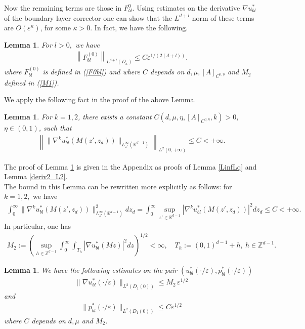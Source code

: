 \documentclass[11pt, reqno]{amsart}
\newtheorem{lemma}[theorem]{Lemma}
\theoremstyle{definition}
\theoremstyle{remark}
\numberwithin{equation}{section}
\begin{document}
	\noindent Now the remaining terms are those in $F^0_{bl}.$ Using estimates on the derivative $\nabla u_{bl}^*$ of the boundary layer corrector one can show that the $L^{d+l}$ norm of these terms are $O(\varepsilon^\kappa)$, for some $\kappa>0$. In fact, we have the following.
	
	\begin{lemma}\label{estimF0bl}For $l >0,$ we have
		\begin{align*}
			\left\|	F^{(0)}_{bl} \right\|_{L^{d+l}(D_x)} \leq C\varepsilon^{1/(2(d+l))}.
		\end{align*}
		where $F^{(0)}_{bl}$ is defined in \textup{(\ref{F0bl})} and 	where $C$ depends on $d, \mu, [A]_{C^{0,\eta}}$ and $M_2$ defined in \textup{(\ref{M1})}.
	\end{lemma}	
	
	\noindent  We apply the following fact	in the proof of the above Lemma.
	\begin{lemma}\label{LinfL2}
		For $k=1,2$, there exists a constant $C(d,\mu,\eta, [A]_{ C^{0,\eta} },k)>0$, $\eta\in(0,1)$,  such that 
		\begin{align*}
		 \left\|  \| \nabla^k u_{bl}^*(M(z',z_d))\|_{L_{z'}^\infty(\mathbb{R}^{d-1})}  \right\|_{L^2(0,+\infty)} \leq C< +\infty.
		\end{align*}
	\end{lemma}
	\noindent	The proof of Lemma \ref{LinfL2} is given in the Appendix as proofs of Lemma \ref{LinfLq} and Lemma \ref{deriv2_L2}.\\
	
		\noindent The bound in this Lemma can be rewritten more explicitly as follows: for $k=1,2,$ we have
	\begin{align*}
		\int_0^\infty  \| \nabla^k u_{bl}^*(M (z',z_d))\|^2_{L_{z'}^\infty(\mathbb{R}^{d-1})} dz_d =   \int_0^\infty  \sup_{z'\in \mathbb{R}^{d-1}} | \nabla^k u_{bl}^*(M(z',z_d))|^2 dz_d \leq C < +\infty.
	\end{align*}
	In particular, one has 
	\begin{align}\label{M1}
		M_2:= \left( \sup_{h\in\mathbb{Z}^{d-1}} \int_0^\infty \!\!\int_{T_h} |\nabla u^*_{bl}(Mz)|^2 dz \right)^{\!\!\!1/2} \!\!\! <\infty , \quad  T_h:= (0,1)^{d-1}+h, \ h\in\mathbb{Z}^{d-1}.
	\end{align}

	
	
	\begin{lemma}\label{estim_nabu_p}
		We have the following estimates on the pair $\left(u_{bl}^*(\cdot/\varepsilon),  p_{bl}^*(\cdot/\varepsilon)\right)$ 
		\begin{align}\label{nab_uespL2}
			\|\nabla u_{bl}^*(\cdot/\varepsilon) \|_{L^2(D_1(0))}\leq  M^{}_2  \,  \varepsilon^{1/2}
		\end{align}
		and
		\begin{align}\label{p_epsL2}
			\|p_{bl}^*(\cdot/\varepsilon) \|_{L^2(D_1(0))}\leq C\varepsilon^{1/2}
		\end{align}
		where $C$ depends on $d, \mu$ and $M_2$.
	\end{lemma}
	
\end{document}
